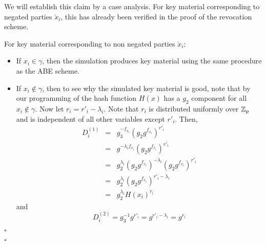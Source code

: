 \documentclass[a4paper, 11pt]{article}
\newenvironment{proof}{\par\noindent{\bf Proof.}}{$\square$\par\bigskip}
\theoremstyle{definition}
\begin{document}
\begin{proof}
\begin{proof}

We will establish this claim by a case analysis.
For key material corresponding to negated parties $\breve{x}_i$, this has already been verified in the proof of the revocation scheme.

%

For key material corresponding to non negated parties $\breve{x}_i$:


\begin{itemize}
\item
If $x_i \in \gamma$, then the simulation produces key material using the same procedure as the ABE scheme.

\item
If $x_i \notin \gamma$, then to see why the simulated key material is
good, note that by our programming of the hash function $H(x)$ has a
$g_2$ component for all $x_i\notin\gamma$.  Now let
$r_{i}=r'_{i}-\lambda_i$.  Note that $r_i$ is
distributed uniformly over $\mathbb{Z}_p$ and is independent of all other
variables except $r'_i$.  Then,
\begin{eqnarray*}
D_i^{(1)}&=&g_3^{-f_{x_i}} (g_2 g^{f_{x_i}})^{r'_i}\\
&=&g^{-\lambda_i f_{x_i} }  (g_2  g^{f_{x_i}})^{r'_i}\\
&=&g_2^{\lambda_i} (g_2 g^{f_{x_i}})^{-\lambda_i } (g_2 g^{f_{x_i}})^{r'_i}\\
&=&g_2^{\lambda_i}(g_2 g^{f_{x_i}})^{r'_i-\lambda_i }\\
&=&g_2^{\lambda_i}H(x_i)^{r_i}
\end{eqnarray*}
and \[D_i^{(2)}=g_3^{-1}g^{r'_i}=g^{r'_i-\lambda_i}=g^{r_i}\]
\end{itemize}

\end{proof}


\end{proof}
\end{document}
